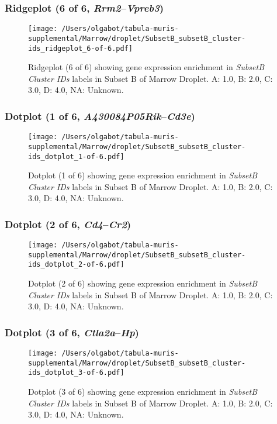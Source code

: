 \clearpage

\subsubsection{Ridgeplot (6 of 6, \emph{Rrm2}--\emph{Vpreb3})}
\begin{figure}[h]
\centering
\texttt{[image: /Users/olgabot/tabula-muris-supplemental/Marrow/droplet/SubsetB\_subsetB\_cluster-ids\_ridgeplot\_6-of-6.pdf]}

\caption{ Ridgeplot (6 of 6)  showing gene expression enrichment in \emph{SubsetB Cluster IDs} labels in Subset B of Marrow Droplet. A: 1.0, B: 2.0, C: 3.0, D: 4.0, NA: Unknown.}
\end{figure}


\clearpage

\subsubsection{Dotplot (1 of 6, \emph{A430084P05Rik}--\emph{Cd3e})}
\begin{figure}[h]
\centering
\texttt{[image: /Users/olgabot/tabula-muris-supplemental/Marrow/droplet/SubsetB\_subsetB\_cluster-ids\_dotplot\_1-of-6.pdf]}

\caption{ Dotplot (1 of 6)  showing gene expression enrichment in \emph{SubsetB Cluster IDs} labels in Subset B of Marrow Droplet. A: 1.0, B: 2.0, C: 3.0, D: 4.0, NA: Unknown.}
\end{figure}


\clearpage

\subsubsection{Dotplot (2 of 6, \emph{Cd4}--\emph{Cr2})}
\begin{figure}[h]
\centering
\texttt{[image: /Users/olgabot/tabula-muris-supplemental/Marrow/droplet/SubsetB\_subsetB\_cluster-ids\_dotplot\_2-of-6.pdf]}

\caption{ Dotplot (2 of 6)  showing gene expression enrichment in \emph{SubsetB Cluster IDs} labels in Subset B of Marrow Droplet. A: 1.0, B: 2.0, C: 3.0, D: 4.0, NA: Unknown.}
\end{figure}


\clearpage

\subsubsection{Dotplot (3 of 6, \emph{Ctla2a}--\emph{Hp})}
\begin{figure}[h]
\centering
\texttt{[image: /Users/olgabot/tabula-muris-supplemental/Marrow/droplet/SubsetB\_subsetB\_cluster-ids\_dotplot\_3-of-6.pdf]}

\caption{ Dotplot (3 of 6)  showing gene expression enrichment in \emph{SubsetB Cluster IDs} labels in Subset B of Marrow Droplet. A: 1.0, B: 2.0, C: 3.0, D: 4.0, NA: Unknown.}
\end{figure}



